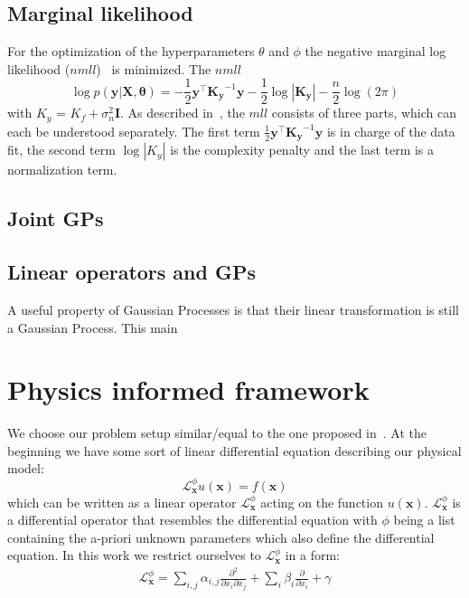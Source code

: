 \documentclass{article}
\begin{document}
\subsection{Marginal likelihood}

For the optimization of the hyperparameters $\theta$ and $\phi$ the negative
marginal log likelihood ($nmll$)~\cite{RasmussenCarlEdward} is minimized. The
$nmll$
\begin{equation}
    \label{eq:nmll}
    \log p(\bm{y}|\bm{X},\bm{\theta}) = -\frac{1}{2}\bm{y}^\intercal \bm{K_y}^{-1}\bm{y} - \frac{1}{2}\log\left\lvert \bm{K_y}\right\rvert - \frac{n}{2}\log(2\pi)
\end{equation}
with $K_y$ = $K_f + \sigma_n^2 \bm{I}$. As described in~\cite{RasmussenCarlEdward}, the $mll$ consists of three parts, which can each be understood separately. The first term $\frac{1}{2}\bm{y}^\intercal \bm{K_y}^{-1}\bm{y}$ is in charge of the data fit, the second term $\log\left\lvert K_y\right\rvert$ is the complexity penalty and the last term is a normalization term.

\subsection{Joint GPs}

\subsection{Linear operators and GPs}
A useful property of Gaussian Processes is that their linear transformation is
still a Gaussian Process. This main

\section{Physics informed framework}
We choose our problem setup similar/equal to the one proposed in~\cite{RAISSI}. At the beginning we  have some sort of linear differential equation describing our physical model:
\begin{equation}
    \label{eq:Lu=f}
    \mathcal{L}_{\bm{x}}^\phi u(\bm{x}) = f(\bm{x})
\end{equation}
which can be written as a linear operator $\mathcal{L}_{\bm{x}}^\phi$ acting on the function $u(\bm{x})$. $\mathcal{L}_{\bm{x}}^\phi$ is a differential operator that resembles the differential equation with $\phi$ being a list containing the a-priori unknown parameters which also define the differential equation. In this work we restrict ourselves to $\mathcal{L}_{\bm{x}}^\phi$ in a form:
\begin{align}
\mathcal{L}_{\bm{x}}^\phi = \sum_{i,j} \alpha_{i,j} \frac{\partial^2 }{\partial x_i \partial x_j} + \sum_{i} \beta_i \frac{\partial}{\partial x_i} + \gamma 
\end{align}
\end{document}
